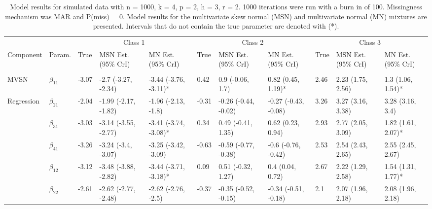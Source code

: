 \documentclass{article}
\begin{document}
\begin{landscape}\begin{table}[t]

\caption{\label{tab:unnamed-chunk-5}Model results for simulated data with n = 1000, k = 4, p = 2, h = 3, r = 2. 1000 iterations were run with a burn in of 100. Missingness mechanism was MAR and P(miss) = 0. Model results for the multivariate skew normal (MSN) and multivariate normal (MN) mixtures are presented. Intervals that do not contain the true parameter are denoted with (*).}
\centering
\fontsize{6}{8}\selectfont
\begin{tabular}{lllllllllll}
\toprule
\multicolumn{2}{c}{ } & \multicolumn{3}{c}{Class 1} & \multicolumn{3}{c}{Class 2} & \multicolumn{3}{c}{Class 3} \\
\cmidrule(l{3pt}r{3pt}){3-5} \cmidrule(l{3pt}r{3pt}){6-8} \cmidrule(l{3pt}r{3pt}){9-11}
Component & Param. & True & MSN Est. (95\% CrI) & MN Est. (95\% CrI)  & True & MSN Est. (95\% CrI) & MN Est. (95\% CrI) & True & MSN Est. (95\% CrI) & MN Est. (95\% CrI)\\
\midrule
\addlinespace[0.3em]
\multicolumn{11}{l}{\textbf{ }}\\
\hspace{1em}MVSN & $\beta_{11}$ & -3.07 & -2.7 (-3.27, -2.34) & -3.44 (-3.76, -3.11)* & 0.42 & 0.9 (-0.06, 1.7) & 0.82 (0.45, 1.19)* & 2.46 & 2.23 (1.75, 2.56) & 1.3 (1.06, 1.54)*\\
\hspace{1em}Regression & $\beta_{21}$ & -2.04 & -1.99 (-2.17, -1.82) & -1.96 (-2.13, -1.8) & -0.31 & -0.26 (-0.44, -0.02) & -0.27 (-0.43, -0.08) & 3.26 & 3.27 (3.16, 3.38) & 3.28 (3.16, 3.4)\\
\hspace{1em} & $\beta_{31}$ & -3.03 & -3.14 (-3.55, -2.77) & -3.41 (-3.74, -3.08)* & 0.34 & 0.49 (-0.41, 1.35) & 0.62 (0.23, 0.94) & 2.93 & 2.77 (2.05, 3.09) & 1.82 (1.61, 2.07)*\\
\hspace{1em} & $\beta_{41}$ & -3.26 & -3.24 (-3.4, -3.07) & -3.25 (-3.42, -3.09) & -0.63 & -0.59 (-0.77, -0.38) & -0.6 (-0.76, -0.42) & 2.53 & 2.54 (2.43, 2.65) & 2.55 (2.45, 2.67)\\
\hspace{1em} & $\beta_{12}$ & -3.12 & -3.48 (-3.88, -2.82) & -3.44 (-3.71, -3.18)* & 0.09 & 0.51 (-0.32, 1.27) & 0.4 (0.04, 0.72) & 2.67 & 2.22 (1.29, 2.58) & 1.54 (1.31, 1.77)*\\
\hspace{1em} & $\beta_{22}$ & -2.61 & -2.62 (-2.77, -2.48) & -2.62 (-2.76, -2.5) & -0.37 & -0.35 (-0.52, -0.15) & -0.34 (-0.51, -0.18) & 2.1 & 2.07 (1.96, 2.18) & 2.08 (1.96, 2.18)\\

\end{tabular}
\end{table}
\end{landscape}
\end{document}
